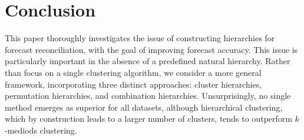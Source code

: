 \documentclass[a4paper,review,12pt,authoryear]{elsarticle}
\begin{document}




\section{Conclusion}
\label{sec:conclusion}

This paper thoroughly investigates the issue of constructing hierarchies for forecast reconciliation, with the goal of improving forecast accuracy. This issue is particularly important in the absence of a predefined natural hierarchy. Rather than focus on a single clustering algorithm, we consider a more general framework, incorporating three distinct approaches: cluster hierarchies, permutation hierarchies, and combination hierarchies. Unsurprisingly, no single method emerges as superior for all datasets, although hierarchical clustering, which by construction leads to a larger number of clusters, tends to outperform $k$-mediods clustering.
\end{document}

